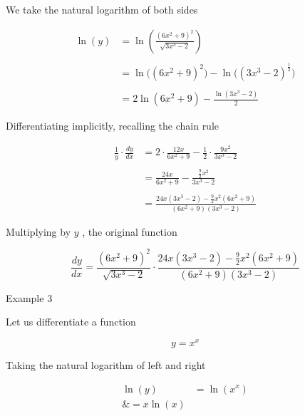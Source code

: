 We take the natural logarithm of both sides

  

 \begin{align}    

 \ln(y)&=\ln\left(\frac{(6x^2+9)^2}{\sqrt{3x^3-2}}\right) \\\\       

 &=\ln\big((6x^2+9)^2\big)-\ln\big((3x^3-2)^{\frac12}\big) \\\\       

 &=2\ln(6x^2+9)-\frac{\ln(3x^3-2)}{2}
 \end{align} 



Differentiating implicitly, recalling the chain rule 



 \begin{align}  

 \frac{1}{y}\cdot\frac                                                

 {dy}{dx}&=2\cdot\frac{12x}{6x^2+9}-\frac12\cdot\frac{9x^2}{3x^3-2} \\\\ 

 &=\frac{24x}{6x^2+9}-\frac{\frac{9}{2}x^2}{3x^3-2} \\\\                 

 &=\frac{24x(3x^3-2)-\frac92x^2(6x^2+9)}{(6x^2+9)(3x^3-2)}
 \end{align} 



Multiplying by $y$ , the original function

     

$$\frac{dy}{dx}=\frac{(6x^2+9)^2}{\sqrt{3x^3-2}}\cdot\frac{24x(3x^3-2)-\frac{9}{2}x^2(6x^2+9)}{(6x^2+9)(3x^3-2)}$$ 



Example 3



Let us differentiate a function



$$y=x^x$$ 



Taking the natural logarithm of left and right

                                                                      

 \begin{align}
\ln(y)&=\ln(x^x) \\\&=x\ln(x)
\end{align} 



